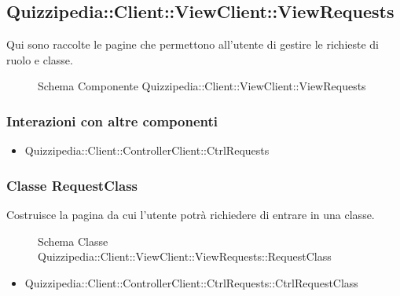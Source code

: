 \subsection{Quizzipedia::Client::ViewClient::ViewRequests}
Qui sono raccolte le pagine che permettono all'utente di gestire le richieste di ruolo e classe.
\begin{figure}[H]
\centering
\noindent{}
\caption[Quizzipedia::Client::ViewClient::ViewRequests]{Schema Componente Quizzipedia::Client::ViewClient::ViewRequests}
\end{figure}
\subsubsection{Interazioni con altre componenti}
\begin{itemize}
\item Quizzipedia::Client::ControllerClient::CtrlRequests
\end{itemize}
\subsubsection{Classe RequestClass}
Costruisce la pagina da cui l'utente potrà richiedere di entrare in una classe.
\begin{figure}[H]
\centering
\noindent{}
\caption{Schema Classe Quizzipedia::Client::ViewClient::ViewRequests::RequestClass}
\end{figure}
\begin{itemize}
\item Quizzipedia::Client::ControllerClient::CtrlRequests::CtrlRequestClass
\end{itemize}
